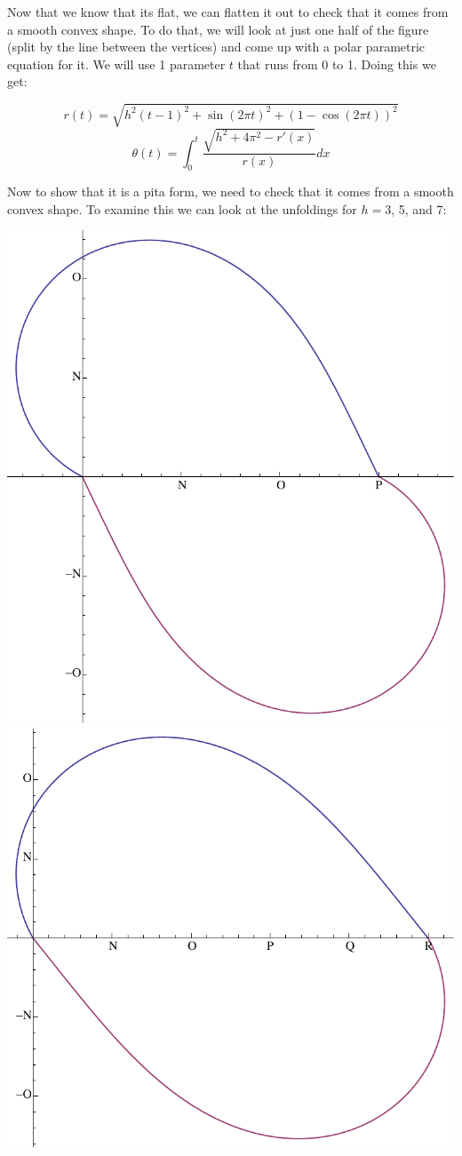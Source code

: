 \documentclass[12pt]{article}
\begin{document}
Now that we know that its flat, we can flatten it out to check that it comes from a smooth convex shape. To do that, we will look at just one half of the figure (split by the line between the vertices) and come up with a polar parametric equation for it. We will use 1 parameter $t$ that runs from 0 to 1. Doing this we get:

$$ r(t) = \sqrt{h^2(t-1)^2+ \sin (2\pi t)^2+ (1-\cos(2\pi t))^2}$$
$$\theta(t) = \int_0^t \frac{\sqrt{h^2 + 4 \pi^2 - r'(x)}}{r(x)} dx$$

Now to show that it is a pita form, we need to check that it comes from a smooth convex shape. To examine this we can look at the unfoldings for $h=3$, 5, and 7:
\begin{center}
\includegraphics[scale=.4]{unfold_h=3.pdf}
\includegraphics[scale=.4]{unfold_h=5.pdf}

\end{center}
\end{document}
